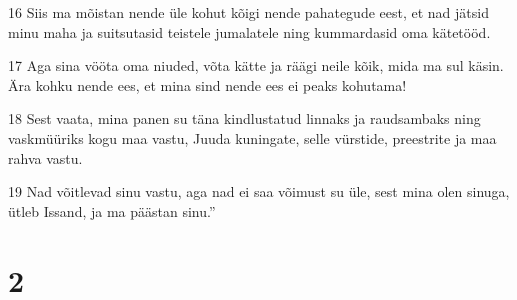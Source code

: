 \par 16 Siis ma mõistan nende üle kohut kõigi nende pahategude eest, et nad jätsid minu maha ja suitsutasid teistele jumalatele ning kummardasid oma kätetööd.
\par 17 Aga sina vööta oma niuded, võta kätte ja räägi neile kõik, mida ma sul käsin. Ära kohku nende ees, et mina sind nende ees ei peaks kohutama!
\par 18 Sest vaata, mina panen su täna kindlustatud linnaks ja raudsambaks ning vaskmüüriks kogu maa vastu, Juuda kuningate, selle vürstide, preestrite ja maa rahva vastu.
\par 19 Nad võitlevad sinu vastu, aga nad ei saa võimust su üle, sest mina olen sinuga, ütleb Issand, ja ma päästan sinu.”

\chapter{2}

